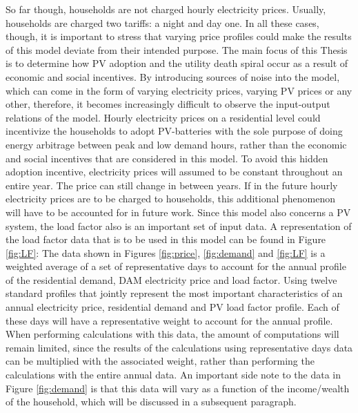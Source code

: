 So far though, households are not charged hourly electricity prices. Usually, households are charged two tariffs: a night and day one. In all these cases, though, it is important to stress that varying price profiles could make the results of this model deviate from their intended purpose. The main focus of this Thesis is to determine how PV adoption and the utility death spiral occur as a result of economic and social incentives. By introducing sources of noise into the model, which can come in the form of varying electricity prices, varying PV prices or any other, therefore, it becomes increasingly difficult to observe the input-output relations of the model. Hourly electricity prices on a residential level could incentivize the households to adopt PV-batteries with the sole purpose of doing energy arbitrage between peak and low demand hours, rather than the economic and social incentives that are considered in this model. To avoid this hidden adoption incentive, electricity prices will assumed to be constant throughout an entire year. The price can still change in between years. If in the future hourly electricity prices are to be charged to households, this additional phenomenon will have to be accounted for in future work. 
\newline \newline \noindent
Since this model also concerns a PV system, the load factor also is an important set of input data. A representation of the load factor data that is to be used in this model can be found in Figure \ref{fig:LF}:
The data shown in Figures \ref{fig:price},  \ref{fig:demand} and \ref{fig:LF} is a weighted average of a set of representative days to account for the annual profile of the residential demand, DAM electricity price and load factor. Using twelve standard profiles that jointly represent the most important characteristics of an annual electricity price, residential demand and PV load factor profile. Each of these days will have a representative weight to account for the annual profile. When performing calculations with this data, the amount of computations will remain limited, since the results of the calculations using representative days data can be multiplied with the associated weight, rather than performing the calculations with the entire annual data. An important side note to the data in Figure \ref{fig:demand} is that this data will vary as a function of the income/wealth of the household, which will be discussed in a subsequent paragraph.

